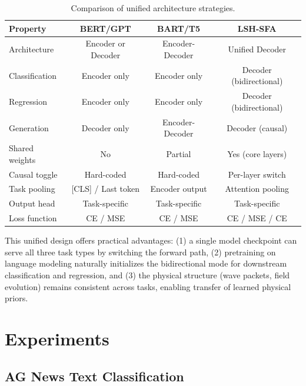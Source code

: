 \documentclass{article}
\begin{document}
\begin{table}[h]
\centering
\caption{Comparison of unified architecture strategies.}
\label{tab:unified_arch}
\begin{tabular}{lccc}
\toprule
\textbf{Property} & \textbf{BERT/GPT} & \textbf{BART/T5} & \textbf{LSH-SFA} \\
\midrule
Architecture & Encoder or Decoder & Encoder-Decoder & Unified Decoder \\
Classification & Encoder only & Encoder only & Decoder (bidirectional) \\
Regression & Encoder only & Encoder only & Decoder (bidirectional) \\
Generation & Decoder only & Encoder-Decoder & Decoder (causal) \\
Shared weights & No & Partial & Yes (core layers) \\
Causal toggle & Hard-coded & Hard-coded & Per-layer switch \\
Task pooling & [CLS] / Last token & Encoder output & Attention pooling \\
Output head & Task-specific & Task-specific & Task-specific \\
Loss function & CE / MSE & CE / MSE & CE / MSE / CE \\
\bottomrule
\end{tabular}
\end{table}

This unified design offers practical advantages: (1) a single model checkpoint can serve all three task types by switching the forward path, (2) pretraining on language modeling naturally initializes the bidirectional mode for downstream classification and regression, and (3) the physical structure (wave packets, field evolution) remains consistent across tasks, enabling transfer of learned physical priors.

\section{Experiments}

\subsection{AG News Text Classification}
\end{document}
